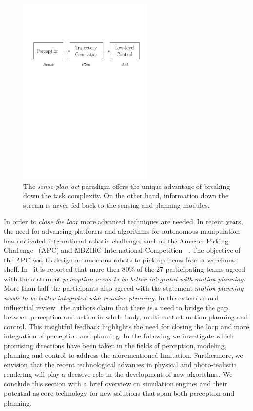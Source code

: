 \begin{figure}[h!]
    \centering
    \includegraphics[width=0.6\textwidth]{images/sense_plan_act.pdf}
    \caption{The \emph{sense-plan-act} paradigm offers the unique advantage of breaking down the task complexity. On the other hand, information down the stream is never fed back to the sensing and planning modules.}
    \label{fig:sense_plan_act}
\end{figure}

In order to \emph{close the loop} more advanced techniques are needed. In recent years, the need for advancing platforms and  
algorithms for autonomous manipulation has motivated international robotic challenges such as the Amazon Picking Challenge~\cite{correll2016analysis} (APC) and MBZIRC International Competition ~\cite{baca2020autonomous}. The objective of the APC was to design autonomous robots to pick up items from a warehouse shelf. In~\cite{cooper2020ari} it is reported that more then 80\% of the 27 participating teams agreed with the statement \emph{perception needs to be better integrated with motion planning}. More than half the participants also agreed with the statement \emph{motion planning needs to be better integrated with reactive planning}. In the extensive and influential review~\cite{bohg2017interactive} the authors claim that there is a need to bridge the gap between perception and action in whole-body, multi-contact motion planning and control. This insightful feedback highlights the need for closing the loop and more integration of perception and planning. In the following we investigate which promising directions have been taken in the fields of perception, modeling, planning and control to address the aforementioned limitation. Furthermore, we envision that the recent technological advances in physical and photo-realistic rendering will play a decisive role in the development of new algorithms. We conclude this section with a brief overview on simulation engines and their potential as core technology for new solutions that span both perception and planning. 

